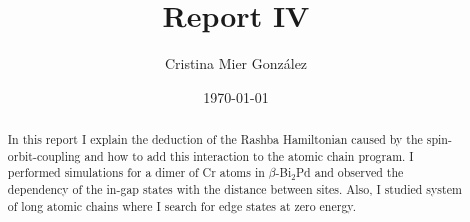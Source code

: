 \documentclass[letterpaper,12pt]{article}
\begin{document}
\title{Report IV}
\author{Cristina Mier Gonz\'alez}
\date{\today}
\maketitle

\begin{abstract}
In this report I explain the deduction of the Rashba Hamiltonian caused by the spin-orbit-coupling and how to add this interaction to the atomic chain program. I performed simulations for a dimer of Cr atoms in $\beta$-Bi$_2$Pd and observed the dependency of the in-gap states with the distance between sites. Also, I studied system of long atomic chains where I search for edge states at zero energy.

\end{abstract}
\end{document}
